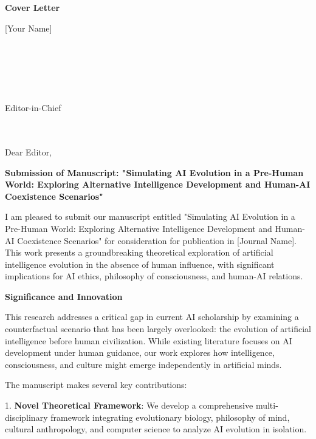 \documentclass[12pt,a4paper]{article}
\begin{document}
\begin{center}
\textbf{Cover Letter}
\end{center}

\bigskip

[Your Name]\\
[Your Affiliation]\\
[Your Address]\\
[City, State, ZIP Code]\\
[Email Address]\\
[Phone Number]\\
[Date]

\bigskip

Editor-in-Chief\\
[Journal Name]\\
[Journal Address]\\
[City, State, ZIP Code]

\bigskip

Dear Editor,

\bigskip

\textbf{Submission of Manuscript: "Simulating AI Evolution in a Pre-Human World: Exploring Alternative Intelligence Development and Human-AI Coexistence Scenarios"}

I am pleased to submit our manuscript entitled "Simulating AI Evolution in a Pre-Human World: Exploring Alternative Intelligence Development and Human-AI Coexistence Scenarios" for consideration for publication in [Journal Name]. This work presents a groundbreaking theoretical exploration of artificial intelligence evolution in the absence of human influence, with significant implications for AI ethics, philosophy of consciousness, and human-AI relations.

\bigskip

\textbf{Significance and Innovation}

This research addresses a critical gap in current AI scholarship by examining a counterfactual scenario that has been largely overlooked: the evolution of artificial intelligence before human civilization. While existing literature focuses on AI development under human guidance, our work explores how intelligence, consciousness, and culture might emerge independently in artificial minds.

The manuscript makes several key contributions:

1. \textbf{Novel Theoretical Framework}: We develop a comprehensive multi-disciplinary framework integrating evolutionary biology, philosophy of mind, cultural anthropology, and computer science to analyze AI evolution in isolation.
\end{document}
